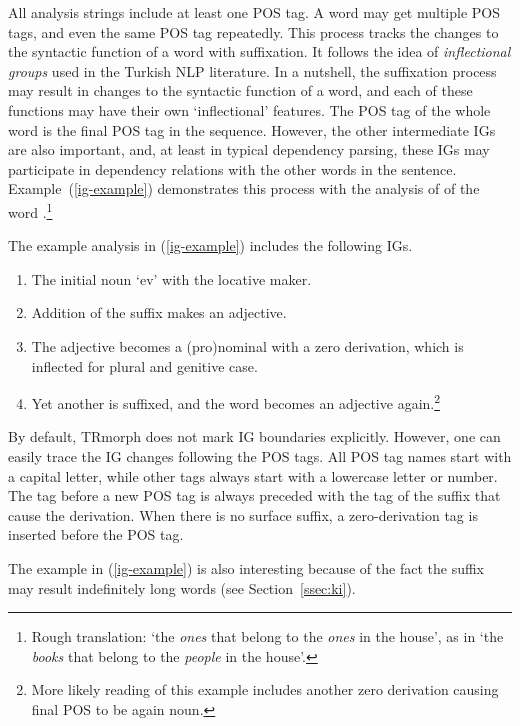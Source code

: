 \documentclass[twocolumn]{article}
\begin{document}
All analysis strings include at least one POS tag. A word may get
multiple POS tags, and even the same POS tag repeatedly. This process
tracks the changes to the syntactic function of a word with
suffixation.  It follows the idea of \emph{inflectional groups}
\parencite[IGs,][]{oflazer1999,oflazer2003}  used in the Turkish NLP
literature. In a nutshell, the suffixation process may result in
changes to the syntactic function of a word, and each of these
functions may have their own `inflectional' features.  The POS tag of
the whole word is the final POS tag in the sequence. However, the
other intermediate IGs are also important, and, at least in typical
dependency parsing, these IGs may participate in dependency relations
with the other words in the sentence.  Example~(\ref{ig-example})
demonstrates this process with the analysis of of the word
.\footnote{Rough translation: `the \emph{ones} that
belong to the \emph{ones} in the house', as in `the \emph{books} that
belong to the \emph{people} in the house'.}


The example analysis in (\ref{ig-example}) includes the following IGs.

\begin{enumerate}
\item The initial noun `ev' with the locative maker.
\item Addition of the suffix  makes an adjective.
\item The adjective becomes a (pro)nominal with a zero derivation,
which is inflected for plural and genitive case.
\item Yet another  is suffixed, and the word becomes an
adjective again.\footnote{More likely reading of this example
includes another zero derivation causing final POS to be again noun.}
\end{enumerate}

By default, TRmorph does not mark IG boundaries explicitly. However,
one can easily trace the IG changes following the POS tags. All POS
tag names start with a capital letter, while other tags always start
with a lowercase letter or number. The tag before a new POS tag is
always preceded with the tag of the suffix that cause the derivation.
When there is no surface suffix, a zero-derivation tag  is
inserted before the POS tag.

The example in (\ref{ig-example}) is also interesting because of the
fact the suffix  may result indefinitely long words (see
Section~\ref{ssec:ki}).
\end{document}
